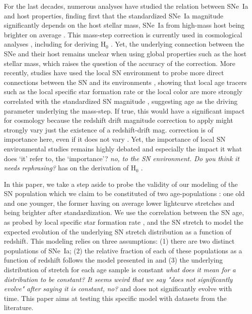 \documentclass[]{aa} %
\newcommand{\nn}[1]{{\textcolor[rgb]{0.25, 0.50, 0}{#1}}}
\newcommand{\yc}[1]{{\textcolor{BrickRed}{#1}}}
\begin{document}
For the last decades, numerous analyses have studied the relation between SNe~Ia
and host properties, finding first that the standardized SNe~Ia magnitude
significantly depends on the host stellar mass, SNe~Ia from high-mass host being
brighter on average \cite[e.g.][]{kelly2010, sullivan2010, childress2013,
betoule2014, rigault2018, kim19}.  This mass-step correction is currently used
in cosmological analyses \citep[e.g.][]{betoule2014, scolnic2018a}, including
for deriving H$_0$ \citep{riess2016, riess2019}. Yet, the underlying connection
between the SNe and their host remains unclear when using global properties such as
the host stellar mass, which raises the question of the accuracy of the
correction. More recently, studies have used the local SN environment to probe
more direct connections between the SN and its environments \citep{rigault2013},
showing that local age tracers such as the local specific star formation rate or
the local color are more strongly correlated with the standardized SN magnitude
\citep{rigault2018, roman2018, kim18}, suggesting age as the driving parameter
underlying the mass-step. If true, this would have a significant impact for
cosmology because the redshift drift magnitude correction to apply might
strongly vary \yc{just the existence of a redshift-drift mag. correction is of importance here, even if it does not vary} \citep{rigault2013,childress2014,scolnic2018a}.  Yet, the
importance of local SN environmental studies remains highly debated
\cite[e.g.][]{jones2015,jones2019} and especially the impact it \yc{what does `it' refer to, the `importance'?} \nn{\textit{no, to the SN environment. Do you think it needs rephrasing?}} has on the
derivation of H$_0$ \citep{jones2015,riess2016,riess2018,rose2019}.

In this paper, we take a step aside to probe the validity of our modeling of the
SN population which we claim to be constituted of two age-populations
\citep{rigault2013,rigault2015,rigault2018}: one old and one younger, the former
having on average lower lightcurve stretches and being brighter after
standardization. We use the correlation between the SN age, \yc{as} probed by local
specific star formation rate \citep{rigault2018}, and the SN stretch to model
the expected evolution of the underlying SN stretch distribution as a function
of redshift. This modeling relies on three assumptions: (1) there are two
\yc{distinct} populations of SNe~Ia; (2) the relative fraction of each of these populations as
a function of redshift follows the \yc{model} presented in \cite{rigault2018}
and (3) the underlying distribution of stretch for each age sample \yc{is constant} \nn{\textit{what does it mean for a distribution to be constant? It seems weird that we say "does not significantly evolve" after saying it is constant, no?}} and does not significantly \yc{evolve with time}. This paper aims at testing this \yc{specific model} with
datasets from the literature.
\end{document}

